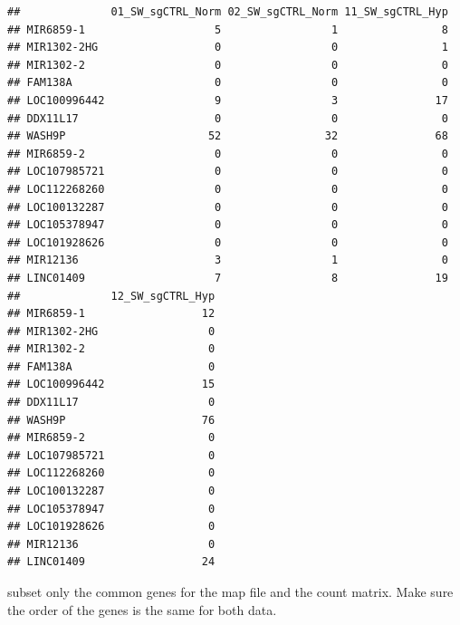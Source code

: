 \documentclass[
]{book}
\newenvironment{Shaded}{\begin{snugshade}}{\end{snugshade}}
\newcommand{\CommentTok}[1]{\textcolor[rgb]{0.56,0.35,0.01}{\textit{#1}}}
\newcommand{\DocumentationTok}[1]{\textcolor[rgb]{0.56,0.35,0.01}{\textbf{\textit{#1}}}}
\newcommand{\FunctionTok}[1]{\textcolor[rgb]{0.13,0.29,0.53}{\textbf{#1}}}
\newcommand{\NormalTok}[1]{#1}
\newcommand{\OtherTok}[1]{\textcolor[rgb]{0.56,0.35,0.01}{#1}}
\newcommand{\SpecialCharTok}[1]{\textcolor[rgb]{0.81,0.36,0.00}{\textbf{#1}}}
\begin{document}
\begin{verbatim}
##              01_SW_sgCTRL_Norm 02_SW_sgCTRL_Norm 11_SW_sgCTRL_Hyp
## MIR6859-1                    5                 1                8
## MIR1302-2HG                  0                 0                1
## MIR1302-2                    0                 0                0
## FAM138A                      0                 0                0
## LOC100996442                 9                 3               17
## DDX11L17                     0                 0                0
## WASH9P                      52                32               68
## MIR6859-2                    0                 0                0
## LOC107985721                 0                 0                0
## LOC112268260                 0                 0                0
## LOC100132287                 0                 0                0
## LOC105378947                 0                 0                0
## LOC101928626                 0                 0                0
## MIR12136                     3                 1                0
## LINC01409                    7                 8               19
##              12_SW_sgCTRL_Hyp
## MIR6859-1                  12
## MIR1302-2HG                 0
## MIR1302-2                   0
## FAM138A                     0
## LOC100996442               15
## DDX11L17                    0
## WASH9P                     76
## MIR6859-2                   0
## LOC107985721                0
## LOC112268260                0
## LOC100132287                0
## LOC105378947                0
## LOC101928626                0
## MIR12136                    0
## LINC01409                  24
\end{verbatim}

subset only the common genes for the map file and the count matrix. Make sure the order of the genes is the same for both data.

\begin{Shaded}
\end{Shaded}
\end{document}
